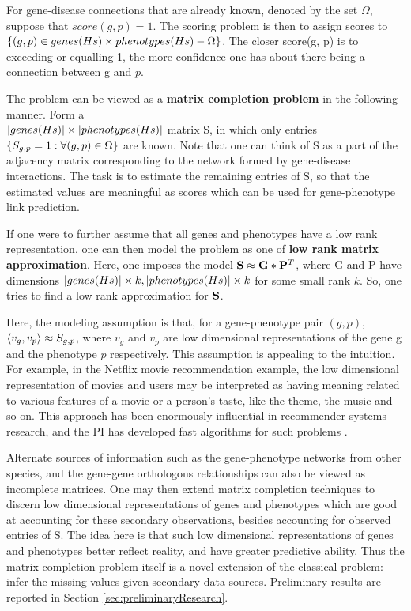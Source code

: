 For gene-disease connections that are already known, denoted by the set $\Omega$, suppose that $score(g, p) = 1$. The scoring problem is then to assign scores to $\left\{ (g, p) \in genes(Hs) \times phenotypes(Hs) - \Omega \right\}$. The closer score(g, p) is to exceeding or equalling 1, the more confidence one has about there being a connection between g and $p$.

The problem can be viewed as a \textbf{matrix completion problem} in the following manner. Form a \\
$\left| genes(Hs)\right| \times \left| phenotypes(Hs)\right|$ matrix S, in which only entries $\left\{ S_{g, p} = 1 : \forall (g, p) \in \Omega \right\}$ are known. Note that one can think of S as a part of the adjacency matrix corresponding to the network formed by gene-disease interactions. The task is to estimate the remaining entries of S, so that the estimated values are meaningful as scores which can be used for gene-phenotype link prediction.

If one were to further assume that all genes and phenotypes have a low rank representation, one can then model the problem as one of \textbf{low rank matrix approximation}. Here, one imposes the model $\mathbf{S} \approx \mathbf{G}*\mathbf{P}^{T}$, where G and P have dimensions $\left| genes(Hs)\right| \times k, \left| phenotypes(Hs)\right| \times k$ for some small rank $k$. So, one tries to find a low rank approximation for $\mathbf{S}$.

Here, the modeling assumption is that, for a gene-phenotype pair $(g, p)$, $\langle v_g, v_p\rangle \approx S_{g, p}$, where $v_g$ and $v_p$ are low dimensional representations of the gene g and the phenotype $p$ respectively. This assumption is appealing to the intuition. For example, in the Netflix movie recommendation example, the low dimensional representation of movies and users may be interpreted as having meaning related to various features of a movie or a person's taste, like the theme, the music and so on. This approach has been enormously influential in recommender systems research, and the PI has developed fast algorithms for such problems \cite{PrateekSVP}.

Alternate sources of information such as the gene-phenotype networks from other species, and the gene-gene orthologous relationships can also be viewed as incomplete matrices. One may then extend matrix completion techniques to discern low dimensional representations of genes and phenotypes which are good at accounting for these secondary observations, besides accounting for observed entries of S. The idea here is that such low dimensional representations of genes and phenotypes better reflect reality, and have greater predictive ability. Thus the matrix completion problem itself is a novel extension of the classical problem: infer the missing values given secondary data sources. Preliminary results are reported in Section \ref{sec:preliminaryResearch}.

